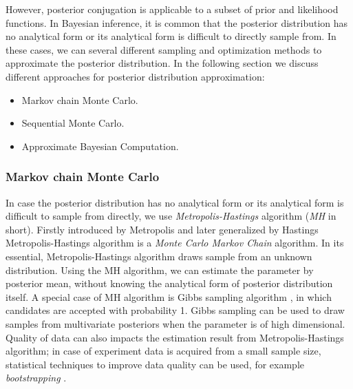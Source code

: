 However, posterior conjugation is applicable to a subset of prior and likelihood functions. In
Bayesian inference, it is common that the posterior distribution has no analytical form or its
analytical form is difficult to directly sample from. In these cases, we can several different
sampling and optimization methods to approximate the posterior distribution. In the following
section we discuss different approaches for posterior distribution approximation:
\begin{itemize}
    \item Markov chain Monte Carlo.
    \item Sequential Monte Carlo.
    \item Approximate Bayesian Computation.
\end{itemize}

\subsubsection{Markov chain Monte Carlo}
In case the posterior distribution has no analytical form or its analytical form is difficult to
sample from directly, we use \textit{Metropolis-Hastings} algorithm  (\textit{MH} in short). Firstly
introduced by Metropolis \cite{metropolis1953equation} and later generalized by Hastings
\cite{hastings1970monte} Metropolis-Hastings algorithm is a \textit{Monte Carlo Markov Chain}
algorithm. In its essential, Metropolis-Hastings algorithm draws sample from an unknown
distribution. Using the MH algorithm, we can estimate the parameter by posterior mean, without
knowing the analytical form of posterior distribution itself. A special case of MH algorithm is
Gibbs sampling algorithm \cite{geman1984stochastic}, in which candidates are accepted with
probability 1. Gibbs sampling can be used to draw samples from multivariate posteriors when the
parameter is of high dimensional. Quality of data can also impacts the estimation result from
Metropolis-Hastings algorithm; in case of experiment data is acquired from a small sample size,
statistical techniques to improve data quality can be used, for example \textit{bootstrapping}
\cite{efron1992bootstrap}.

